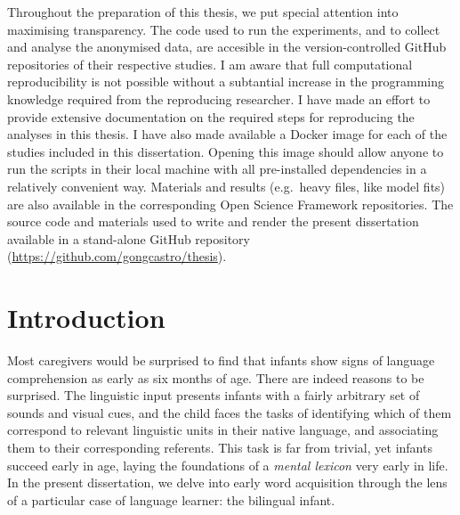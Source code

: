 \documentclass[
  12pt,
  b5paperpaper,
  twoside]{scrreprt}
\renewcommand*\contentsname{Table of contents}
\newcommand\contentsname{Table of contents}
\begin{document}
\begin{spacing}{1.5}
{Throughout the preparation of this thesis, we put special attention into
maximising transparency. The code used to run the experiments, and to
collect and analyse the anonymised data, are accesible in the
version-controlled GitHub repositories of their respective studies. I am
aware that full computational reproducibility is not possible without a
subtantial increase in the programming knowledge required from the
reproducing researcher. I have made an effort to provide extensive
documentation on the required steps for reproducing the analyses in this
thesis. I have also made available a Docker image for each of the
studies included in this dissertation. Opening this image should allow
anyone to run the scripts in their local machine with all pre-installed
dependencies in a relatively convenient way. Materials and results
(e.g.~heavy files, like model fits) are also available in the
corresponding Open Science Framework repositories. The source code and
materials used to write and render the present dissertation available in
a stand-alone GitHub repository
(\url{https://github.com/gongcastro/thesis}).}
\clearpage

\end{spacing}\ifdefined\Shaded\renewenvironment{Shaded}{\begin{tcolorbox}[colback={codebgcolor}, borderline west={3pt}{0pt}{shadecolor}, enhanced, frame hidden, boxrule=0pt, sharp corners, breakable]}{\end{tcolorbox}}\fi

\renewcommand*\contentsname{Table of contents}
{
\hypersetup{linkcolor=}
\setcounter{tocdepth}{2}
\tableofcontents
}

\hypertarget{section}{%
\chapter*{}\label{section}}

\markboth{}{}



\hypertarget{introduction}{%
\chapter{Introduction}\label{introduction}}

Most caregivers would be surprised to find that infants show signs of
language comprehension as early as six months of age. There are indeed
reasons to be surprised. The linguistic input presents infants with a
fairly arbitrary set of sounds and visual cues, and the child faces the
tasks of identifying which of them correspond to relevant linguistic
units in their native language, and associating them to their
corresponding referents. This task is far from trivial, yet infants
succeed early in age, laying the foundations of a \emph{mental lexicon}
very early in life. In the present dissertation, we delve into early
word acquisition through the lens of a particular case of language
learner: the bilingual infant.
\end{document}
